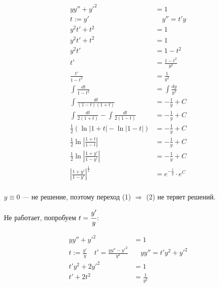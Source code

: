 \begin{align*}
    yy''+y'^2                                           & = 1                           \\
    t := y'                                             & \quad y'' = t'y               \\
    y^2t'+t^2                                           & = 1                           \\
    y^2t'+t^2                                           & = 1                           \\
    y^2t'                                               & = 1 - t^2             \tag{1} \\
    t'                                                  & = \frac{1 - t^2}{y^2} \tag{2} \\
    \frac{t'}{1 - t^2}                                  & = \frac{1}{y^2}               \\
    \int \frac{dt}{1 - t^2}                             & = \int \frac{dy}{y^2}         \\
    \int \frac{dt}{(1 - t)(1 + t)}                      & = -\frac{1}{y} + C            \\
    \int \frac{dt}{2(1 + t)} - \int \frac{dt}{2(1 - t)} & = -\frac{1}{y} + C            \\
    \frac{1}{2}(\ln|1+t| - \ln|1-t|)                    & = -\frac{1}{y} + C            \\
    \frac{1}{2}\ln\left|\frac{1+t}{1-t}\right|          & = -\frac{1}{y} + C            \\
    \frac{1}{2}\ln\left|\frac{1+y'}{1-y'}\right|        & = -\frac{1}{y} + C            \\
    \left|\frac{1+y'}{1-y'}\right|^{\frac{1}{2}}        & = e^{-\frac{1}{y}} \cdot e^C  \\
\end{align*}

$y\equiv0$ --- не решение, поэтому переход (1) $\Rightarrow$ (2) не теряет решений.

Не работает, попробуем $t = \cfrac{y'}{y}$:

\begin{align*}
    yy''+y'^2                                            & = 1                       \\
    t := \frac{y'}{y} \quad t' = \frac{yy'' - y'^2}{y^2} & \quad yy'' = t'y^2 + y'^2 \\
    t'y^2 + 2y'^2                                        & = 1                       \\
    t' + 2t^2                                            & = \frac{1}{y^2}           \\
\end{align*}

